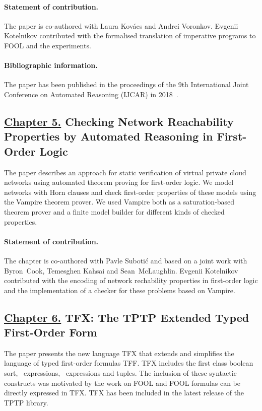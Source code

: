 \paragraph{Statement of contribution.} The paper is co-authored with Laura Kov\'{a}cs and Andrei Voronkov. Evgenii Kotelnikov contributed with the formalised translation of imperative programs to FOOL and the experiments.

\paragraph{Bibliographic information.} The paper has been published in the proceedings of the 9th International Joint Conference on Automated Reasoning (IJCAR) in 2018~\cite{KKV18}.

\subsection*{\hyperref[chap:aws]{Chapter 5.} Checking Network Reachability Properties by Automated Reasoning in First-Order Logic}
The paper describes an approach for static verification of virtual private cloud networks using automated theorem proving for first-order logic. We model networks with Horn clauses and check first-order properties of these models using the Vampire theorem prover. We used Vampire both as a saturation-based theorem prover and a finite model builder for different kinds of checked properties.

\paragraph{Statement of contribution.} The chapter is co-authored with Pavle Suboti\'{c} and based on a joint work with Byron~Cook, Temesghen Kahsai and Sean~McLaughlin. Evgenii Kotelnikov contributed with the encoding of network rechability properties in first-order logic and the implementation of a checker for these problems based on Vampire.

\subsection*{\hyperref[chap:tfx]{Chapter 6.} TFX: The TPTP Extended Typed First-Order Form}
The paper presents the new language TFX that extends and simplifies the language of typed first-order formulas TFF. TFX includes the first class boolean sort, \ITE\ expressions, \LETIN\ expressions and tuples. The inclusion of these syntactic constructs was motivated by the work on FOOL and FOOL formulas can be directly expressed in TFX. TFX has been included in the latest release of the TPTP library.

